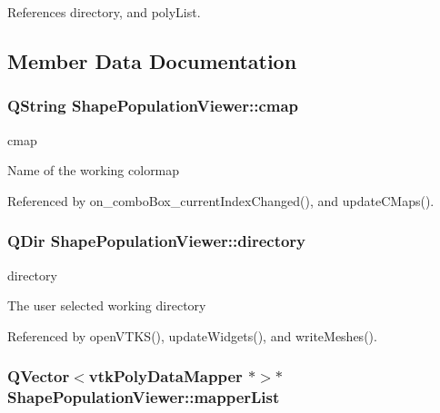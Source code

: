 References directory, and poly\-List.



\subsection{Member Data Documentation}
\hypertarget{class_shape_population_viewer_a69f478eade0bf23b94037e5a09dfc127}{
\subsubsection[{cmap}]{\setlength{\rightskip}{0pt plus 5cm}Q\-String Shape\-Population\-Viewer\-::cmap\hspace{0.3cm}{\ttfamily [protected]}}}\label{class_shape_population_viewer_a69f478eade0bf23b94037e5a09dfc127}


cmap 

Name of the working colormap 

Referenced by on\-\_\-combo\-Box\-\_\-current\-Index\-Changed(), and update\-C\-Maps().

\hypertarget{class_shape_population_viewer_aa466212a0536242cedb4233e4cf6492b}{
\subsubsection[{directory}]{\setlength{\rightskip}{0pt plus 5cm}Q\-Dir Shape\-Population\-Viewer\-::directory\hspace{0.3cm}{\ttfamily [protected]}}}\label{class_shape_population_viewer_aa466212a0536242cedb4233e4cf6492b}


directory 

The user selected working directory 

Referenced by open\-V\-T\-K\-S(), update\-Widgets(), and write\-Meshes().

\hypertarget{class_shape_population_viewer_a512b562448c7236c0c1bdf981a0a7322}{
\subsubsection[{mapper\-List}]{\setlength{\rightskip}{0pt plus 5cm}Q\-Vector$<$vtk\-Poly\-Data\-Mapper $\ast$$>$$\ast$ Shape\-Population\-Viewer\-::mapper\-List\hspace{0.3cm}{\ttfamily [protected]}}}\label{class_shape_population_viewer_a512b562448c7236c0c1bdf981a0a7322}


